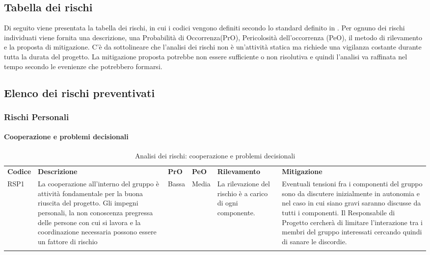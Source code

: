 \subsection{Tabella dei rischi}
Di seguito viene presentata la tabella dei rischi, in cui i codici vengono definiti secondo lo standard definito in .
Per ognuno dei rischi individuati viene fornita una descrizione, una Probabilità di Occorrenza(PrO), Pericolosità dell'occorrenza (PeO), il metodo di rilevamento e la proposta di mitigazione. C'è da sottolineare che l'analisi dei rischi non è un'attività statica ma richiede una vigilanza costante durante tutta la durata del progetto. La mitigazione proposta potrebbe non essere sufficiente o non risolutiva e quindi l'analisi va raffinata nel tempo secondo le evenienze che potrebbero formarsi.

\newpage
		
\subsection{Elenco dei rischi preventivati}

\subsubsection{Rischi Personali}
\paragraph{Cooperazione e problemi decisionali}
\begin{center}
	\begin{longtable}{p{1cm}|p{4cm}|p{0.7cm}|p{0.7cm}|p{3cm}|p{4cm}}
		\arrayrulecolor{lightest-grayest}
		\rowcolor{blue!20}
		\textbf{Codice} & 
		\textbf{Descrizione} &
		\textbf{PrO}  &
		\textbf{PeO}  &				        
		\textbf{Rilevamento} &
		\textbf{Mitigazione} \\	
		RSP1 & La cooperazione all'interno del gruppo è attività fondamentale per la buona riuscita del progetto. Gli impegni personali, la non conoscenza pregressa delle persone con cui si lavora e la coordinazione necessaria possono essere un fattore di rischio & Bassa & Media & La rilevazione del rischio è a carico di ogni componente. & Eventuali tensioni fra i componenti del gruppo sono da discutere inizialmente in autonomia e nel caso in cui siano gravi saranno discusse da tutti i componenti. Il Responsabile di Progetto cercherà di limitare l'interazione tra i membri del gruppo interessati cercando quindi di sanare le discordie. \\
		
		\caption{Analisi dei rischi: cooperazione e problemi decisionali}
	\end{longtable}
\end{center}

